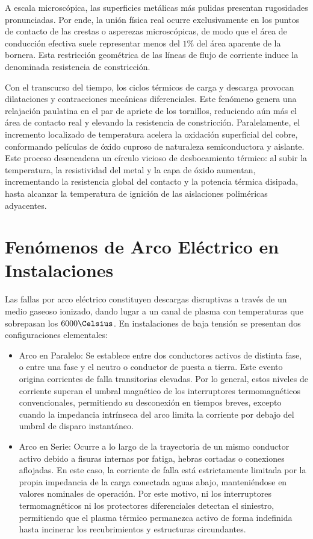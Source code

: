 A escala microscópica, las superficies metálicas más pulidas presentan rugosidades pronunciadas. Por ende, la unión
física real ocurre exclusivamente en los puntos de contacto de las crestas o asperezas microscópicas,
de modo que el área de conducción efectiva suele representar menos del $1\percent$ del área aparente de la bornera.
Esta restricción geométrica de las líneas de flujo de corriente induce la denominada resistencia de constricción.

Con el transcurso del tiempo, los ciclos térmicos de carga y descarga provocan dilataciones y contracciones mecánicas
diferenciales. Este fenómeno genera una relajación paulatina en el par de apriete de los tornillos, reduciendo aún más el
área de contacto real y elevando la resistencia de constricción. Paralelamente, el incremento localizado de temperatura
acelera la oxidación superficial del cobre, conformando películas de óxido cuproso de naturaleza semiconductora y
aislante. Este proceso desencadena un círculo vicioso de desbocamiento térmico: al subir la temperatura, la resistividad
del metal y la capa de óxido aumentan, incrementando la resistencia global del contacto y la potencia térmica disipada,
hasta alcanzar la temperatura de ignición de las aislaciones poliméricas adyacentes.

\section{Fenómenos de Arco Eléctrico en Instalaciones}

Las fallas por arco eléctrico constituyen descargas disruptivas a través de un medio gaseoso ionizado, dando lugar a un
canal de plasma con temperaturas que sobrepasan los $6000\Celsius$. En instalaciones de baja tensión se presentan dos
configuraciones elementales:

\begin{itemize}
    \item Arco en Paralelo: Se establece entre dos conductores activos de distinta fase, o entre una fase y el neutro o
          conductor de puesta a tierra. Este evento origina corrientes de falla transitorias elevadas. Por lo general,
          estos niveles de corriente superan el umbral magnético de los interruptores termomagnéticos convencionales,
          permitiendo su desconexión en tiempos breves, excepto cuando la impedancia intrínseca del arco limita la
          corriente por debajo del umbral de disparo instantáneo.
    \item Arco en Serie: Ocurre a lo largo de la trayectoria de un mismo conductor activo debido a fisuras internas por
          fatiga, hebras cortadas o conexiones aflojadas. En este caso, la corriente de falla está estrictamente limitada
          por la propia impedancia de la carga conectada aguas abajo, manteniéndose en valores nominales de operación. Por
          este motivo, ni los interruptores termomagnéticos ni los protectores diferenciales detectan el siniestro,
          permitiendo que el plasma térmico permanezca activo de forma indefinida hasta incinerar los recubrimientos y
          estructuras circundantes.
\end{itemize}
